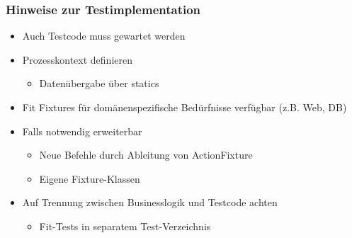 \documentclass[a4paper,10pt]{article}
\begin{document}
\subsubsection{Hinweise zur Testimplementation}
\begin{itemize}
\item Auch Testcode muss gewartet werden
\item Prozesskontext definieren
	\begin{itemize}
		\item Datenübergabe über statics 
	\end{itemize}
\item Fit Fixtures für domänenspezifische Bedürfnisse verfügbar (z.B. Web, DB)
\item Falls notwendig erweiterbar
	\begin{itemize}
		\item Neue Befehle durch Ableitung von ActionFixture
		\item Eigene Fixture-Klassen
	\end{itemize}
\item Auf Trennung zwischen Businesslogik und Testcode achten
	\begin{itemize}
		\item Fit-Tests in separatem Test-Verzeichnis
	\end{itemize}
\end{itemize}

\newpage
\end{document}
